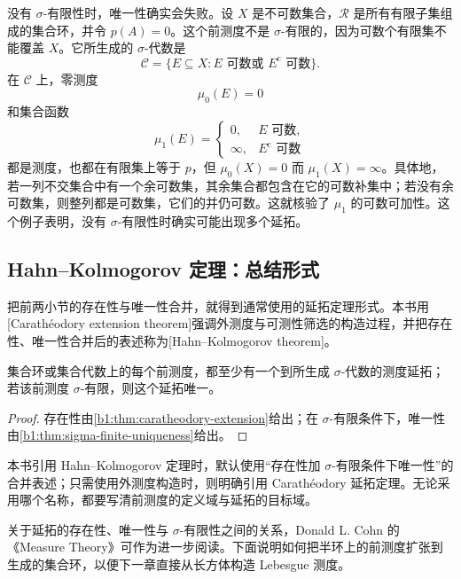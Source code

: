 没有 \(\sigma\)-有限性时，唯一性确实会失败。设 \(X\) 是不可数集合，\(\mathcal R\) 是所有有限子集组成的集合环，并令 \(p(A)=0\)。这个前测度不是 \(\sigma\)-有限的，因为可数个有限集不能覆盖 \(X\)。它所生成的 \(\sigma\)-代数是
\[
\mathcal C=\{E\subseteq X:E\text{ 可数或 }E^{\mathrm c}\text{ 可数}\}.
\]
在 \(\mathcal C\) 上，零测度
\[
\mu_0(E)=0
\]
和集合函数
\[
\mu_1(E)=
\begin{cases}
0,&E\text{ 可数},\\
\infty,&E^{\mathrm c}\text{ 可数}
\end{cases}
\]
都是测度，也都在有限集上等于 \(p\)，但 \(\mu_0(X)=0\) 而 \(\mu_1(X)=\infty\)。具体地，若一列不交集合中有一个余可数集，其余集合都包含在它的可数补集中；若没有余可数集，则整列都是可数集，它们的并仍可数。这就核验了 \(\mu_1\) 的可数可加性。这个例子表明，没有 \(\sigma\)-有限性时确实可能出现多个延拓。

\subsection{Hahn--Kolmogorov 定理：总结形式}
\label{b1:subsec:020404}

把前两小节的存在性与唯一性合并，就得到通常使用的延拓定理形式。本书用[Carathéodory extension theorem]强调外测度与可测性筛选的构造过程，并把存在性、唯一性合并后的表述称为[Hahn--Kolmogorov theorem]。

\begin{theorem}
\label{b1:thm:hahn-kolmogorov}
集合环或集合代数上的每个前测度，都至少有一个到所生成 \(\sigma\)-代数的测度延拓；若该前测度 \(\sigma\)-有限，则这个延拓唯一。
\end{theorem}
\begin{proof}
存在性由\cref{b1:thm:caratheodory-extension}给出；在 \(\sigma\)-有限条件下，唯一性由\cref{b1:thm:sigma-finite-uniqueness}给出。
\end{proof}

本书引用 Hahn--Kolmogorov 定理时，默认使用“存在性加 \(\sigma\)-有限条件下唯一性”的合并表述；只需使用外测度构造时，则明确引用 Carathéodory 延拓定理。无论采用哪个名称，都要写清前测度的定义域与延拓的目标域。

\ProseParagraphBreak

关于延拓的存在性、唯一性与 \(\sigma\)-有限性之间的关系，Donald L. Cohn 的《Measure Theory》\cite{Cohn2013Measure}可作为进一步阅读。下面说明如何把半环上的前测度扩张到生成的集合环，以便下一章直接从长方体构造 Lebesgue 测度。

